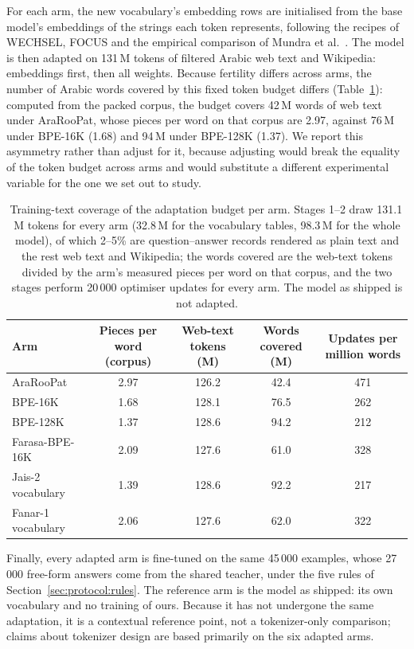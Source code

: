 \documentclass[a4paper,fleqn]{cas-sc}
\begin{document}
For each arm, the new vocabulary's embedding rows are initialised from the base model's embeddings of the strings each token represents, following the recipes of WECHSEL, FOCUS and the empirical comparison of Mundra et al.\ \citep{minixhofer2022wechsel,dobler2023focus,mundra2024empirical}. The model is then adapted on 131\,M tokens of filtered Arabic web text and Wikipedia: embeddings first, then all weights. Because fertility differs across arms, the number of Arabic words covered by this fixed token budget differs (Table~\ref{tab:coverage}): computed from the packed corpus, the budget covers 42\,M words of web text under AraRooPat, whose pieces per word on that corpus are 2.97, against 76\,M under BPE-16K (1.68) and 94\,M under BPE-128K (1.37). We report this asymmetry rather than adjust for it, because adjusting would break the equality of the token budget across arms and would substitute a different experimental variable for the one we set out to study.
\begin{table}[t]
\centering
\caption{Training-text coverage of the adaptation budget per arm. Stages 1--2 draw 131.1\,M tokens for every arm (32.8\,M for the vocabulary tables, 98.3\,M for the whole model), of which 2--5\% are question--answer records rendered as plain text and the rest web text and Wikipedia; the words covered are the web-text tokens divided by the arm's measured pieces per word on that corpus, and the two stages perform 20\,000 optimiser updates for every arm. The model as shipped is not adapted.}
\label{tab:coverage}
\begin{tabular}{@{}lcccc@{}}
\toprule
Arm & Pieces per word (corpus) & Web-text tokens (M) & Words covered (M) & Updates per million words \\
\midrule
AraRooPat & 2.97 & 126.2 & 42.4 & 471 \\
BPE-16K & 1.68 & 128.1 & 76.5 & 262 \\
BPE-128K & 1.37 & 128.6 & 94.2 & 212 \\
Farasa-BPE-16K & 2.09 & 127.6 & 61.0 & 328 \\
Jais-2 vocabulary & 1.39 & 128.6 & 92.2 & 217 \\
Fanar-1 vocabulary & 2.06 & 127.6 & 62.0 & 322 \\
\bottomrule
\end{tabular}
\end{table}

Finally, every adapted arm is fine-tuned on the same 45\,000 examples, whose 27\,000 free-form answers come from the shared teacher, under the five rules of Section~\ref{sec:protocol:rules}. The reference arm is the model as shipped: its own vocabulary and no training of ours. Because it has not undergone the same adaptation, it is a contextual reference point, not a tokenizer-only comparison; claims about tokenizer design are based primarily on the six adapted arms.
\end{document}
